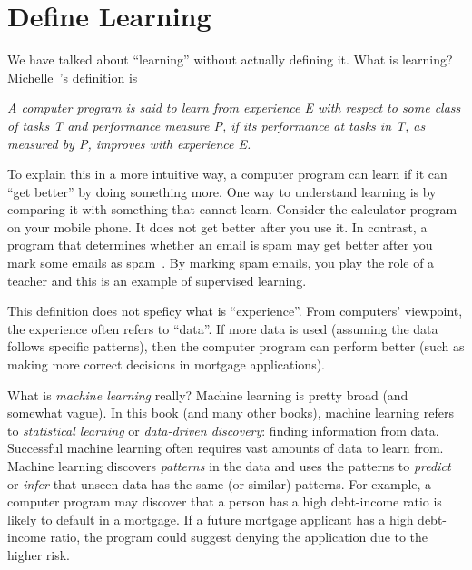 
\section{Define Learning}

  We have talked about ``learning'' without actually defining it.
  What is learning? Michelle~\cite{Mitchell1997MachineLearning}'s
  definition is

  
  
  {\it
    A computer program is said to learn from experience E with respect
    to some class of tasks T and performance measure P, if its
    performance at tasks in T, as measured by P, improves with
    experience E.}

  

  To explain this in a more intuitive way, a computer program can
  learn if it can ``get better'' by doing something more.  One way to
  understand learning is by comparing it with something that cannot
  learn. Consider the calculator program on your mobile phone. It does
  not get better after you use it.  In contrast, a program that
  determines whether an email is spam may get better after you mark
  some emails as spam~\cite{Hastie2009ElementsStatisticalLearning}.
  By marking spam emails, you play the role of a teacher and this is
  an example of supervised learning.




This definition does not speficy what is ``experience''.  From
computers' viewpoint, the experience often refers to ``data''.  If
more data is used (assuming the data follows specific patterns), then
the computer program can perform better (such as making more correct
decisions in mortgage applications).

What is {\it machine learning} really?  Machine learning is pretty
broad (and somewhat vague).  In this book (and many other books),
machine learning refers to {\it statistical learning} or {\it
  data-driven discovery}: finding information from data.  Successful
machine learning often requires vast amounts of data to learn from.
Machine learning discovers {\it patterns} in the data and uses the
patterns to {\it predict} or {\it infer} that unseen data has the same
(or similar) patterns.  For example, a computer program may discover
that a person has a high debt-income ratio is likely to default in a
mortgage.  If a future mortgage applicant has a high debt-income
ratio, the program could suggest denying the application due to the
higher risk.

